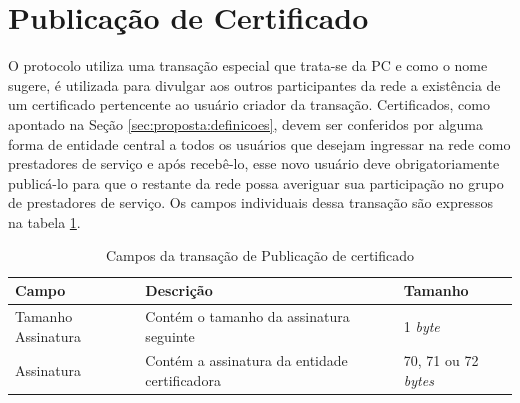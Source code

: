 

\section{Publicação de Certificado}
\label{sec:proposta:certificado}

O protocolo utiliza uma transação especial que trata-se da \ac{PC} e como o nome sugere, é utilizada para divulgar aos outros participantes da rede a existência de um certificado pertencente ao usuário criador da transação. Certificados, como apontado na Seção \ref{sec:proposta:definicoes}, devem ser conferidos por alguma forma de entidade central a todos os usuários que desejam ingressar na rede como prestadores de serviço e após recebê-lo, esse novo usuário deve obrigatoriamente publicá-lo para que o restante da rede possa averiguar sua participação no grupo de prestadores de serviço. Os campos individuais dessa transação são expressos na tabela \ref{tabela:pc}.

\begin{table}[ht]
\centering
    \begin{tabular}{|m{}|m{}|m{}|}
    \hline
         \textbf{Campo} & \textbf{Descrição} & \textbf{Tamanho}  \\
         \hline
         Tamanho Assinatura & Contém o tamanho da assinatura seguinte & 1 \textit{byte} \\
         \hline
         Assinatura & Contém a assinatura da entidade certificadora & 70, 71 ou 72 \textit{bytes} \\
    \hline
    \end{tabular}
    \caption{Campos da transação de Publicação de certificado}
    \label{tabela:pc}
\end{table}

